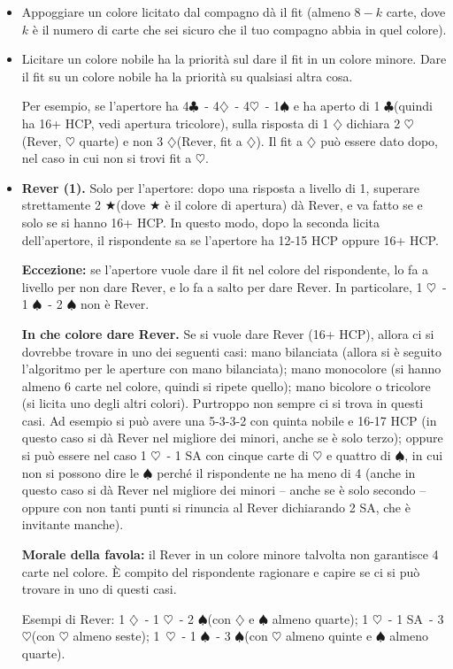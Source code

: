\documentclass[a4paper,10pt]{article}
\renewcommand{\c}{$\clubsuit$\xspace}
\renewcommand{\d}{$\diamondsuit$\xspace}
\newcommand{\h}{$\heartsuit$\xspace}
\newcommand{\s}{$\spadesuit$\xspace}
\renewcommand{\j}{$\bigstar$\xspace}
\newcommand{\sa}{SA\xspace}
\begin{document}
\begin{itemize}
 \item Appoggiare un colore licitato dal compagno dà il fit (almeno $8-k$ carte, dove $k$ è il numero di carte che sei sicuro che il tuo compagno abbia in quel colore).
 \item Licitare un colore nobile ha la priorità sul dare il fit in un colore minore. Dare il fit su un colore nobile ha la priorità su qualsiasi altra cosa.
 
 Per esempio, se l'apertore ha 4\c\ - 4\d\ - 4\h\ - 1\s e ha aperto di 1 \c (quindi ha 16+ HCP, vedi apertura tricolore), sulla risposta di 1 \d dichiara 2 \h (Rever, \h quarte) e non 3 \d (Rever, fit a \d).
 Il fit a \d può essere dato dopo, nel caso in cui non si trovi fit a \h.
 
 \item {\bf Rever (1).} Solo per l'apertore: dopo una risposta a livello di 1, superare strettamente 2 \j (dove \j è il colore di apertura) dà Rever, e va fatto se e solo se si hanno 16+ HCP.
 In questo modo, dopo la seconda licita dell'apertore, il rispondente sa se l'apertore ha 12-15 HCP oppure 16+ HCP.
 
 {\bf Eccezione:} se l'apertore vuole dare il fit nel colore del rispondente, lo fa a livello per non dare Rever, e lo fa a salto per dare Rever. In particolare, 1 \h\ - 1 \s\ - 2 \s non è Rever.
 
 {\bf In che colore dare Rever.} Se si vuole dare Rever (16+ HCP), allora ci si dovrebbe trovare in uno dei seguenti casi: mano bilanciata (allora si è seguito l'algoritmo per le aperture con mano bilanciata); mano monocolore (si hanno almeno 6 carte nel colore, quindi si ripete quello); mano bicolore o tricolore (si licita uno degli altri colori). Purtroppo non sempre ci si trova in questi casi.
 Ad esempio si può avere una 5-3-3-2 con quinta nobile e 16-17 HCP (in questo caso si dà Rever nel migliore dei minori, anche se è solo terzo);
 oppure si può essere nel caso 1 \h\ - 1 \sa con cinque carte di \h e quattro di \s, in cui non si possono dire le \s perché il rispondente ne ha meno di 4 (anche in questo caso si dà Rever nel migliore dei minori -- anche se è solo secondo -- oppure con non tanti punti si rinuncia al Rever dichiarando 2 \sa, che è invitante manche).
 
 {\bf Morale della favola:} il Rever in un colore minore talvolta non garantisce 4 carte nel colore. È compito del rispondente ragionare e capire se ci si può trovare in uno di questi casi.
 
 Esempi di Rever: 1 \d\ - 1 \h\ - 2 \s (con \d e \s almeno quarte); 1 \h\ - 1 \sa\ - 3 \h (con \h almeno seste); \hbox{1 \h}\ - 1 \s\ - 3 \s (con \h almeno quinte e \s almeno quarte).
 

\end{itemize}
\end{document}
